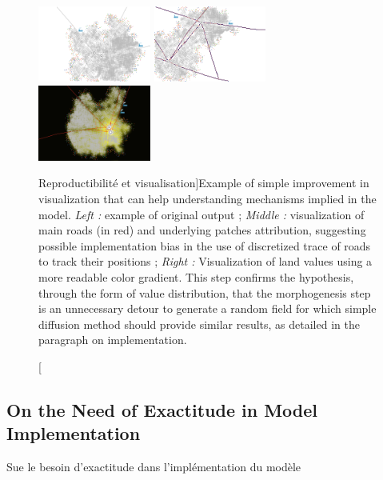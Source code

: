 \begin{figure}
\centering
\hspace{-2cm}
\includegraphics[width=0.33\textwidth]{Figures/PartI/Methodology/Reproducibility/stdView}
\hfill
\includegraphics[width=0.33\textwidth]{Figures/PartI/Methodology/Reproducibility/ViewRoads}
\hfill
\includegraphics[width=0.33\textwidth]{Figures/PartI/Methodology/Reproducibility/landValues_cityFinished}
\caption[Reproducibility and visualization][Reproductibilité et visualisation]{Example of simple improvement in visualization that can help understanding mechanisms implied in the model. \textit{Left : } example of original output ; \textit{Middle : } visualization of main roads (in red) and underlying patches attribution, suggesting possible implementation bias in the use of discretized trace of roads to track their positions ; \textit{Right : }Visualization of land values using a more readable color gradient. This step confirms the hypothesis, through the form of value distribution, that the morphogenesis step is an unnecessary detour to generate a random field for which simple diffusion method should provide similar results, as detailed in the paragraph on implementation.}{}
\label{fig:example_tij_viz}
\end{figure}



\subsection{On the Need of Exactitude in Model Implementation}{Sue le besoin d'exactitude dans l'implémentation du modèle}

